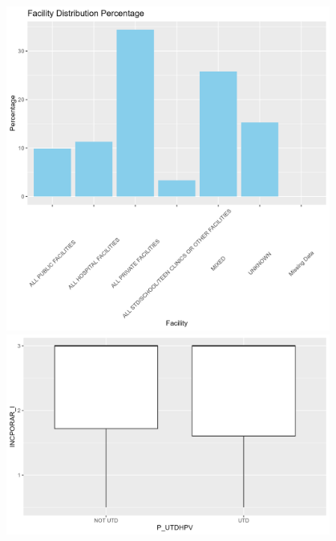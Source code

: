 \documentclass[
  letterpaper,
  DIV=11,
  numbers=noendperiod]{scrartcl}
\begin{document}
\includegraphics[width=0.8\textwidth,height=\textheight]{../../../results/figures/facility.distribution.png}
\includegraphics[width=0.8\textwidth,height=\textheight]{../../../results/figures/income-vaccination.png}
\end{document}
